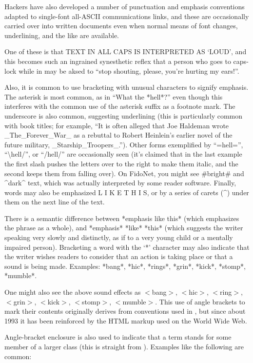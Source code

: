 Hackers have also developed a number of punctuation and emphasis conventions
adapted to single-font all-ASCII communications links, and these are
occasionally carried over into written documents even when normal means of font
changes, underlining, and the like are available.

One of these is that TEXT IN ALL CAPS IS INTERPRETED AS `LOUD', and this
becomes such an ingrained synesthetic reflex that a person who goes to
caps-lock while in  may be aksed to ``stop shouting,
please, you're hurting my ears!''.

Also, it is common to use bracketing with unusual characters to signify
emphasis. The asterisk is most common, as in ``What the *hell*?'' even though
this interferes with the common use of the asterisk suffix as a footnote mark.
The underscore is also common, suggesting underlining (this is particularly
common with book titles; for example, ``It is often alleged that Joe Haldeman
wrote \_The\_Forever\_War\_ as a rebuttal to Robert Heinlein's earlier novel of
the future military, \_Starship\_Troopers\_.''). Other forms exemplified by
``=hell='', ``\textbackslash hell/'', or ``/hell/'' are occasionally seen (it's
claimed that in the last example the first slash pushes the letters over to the
right to make them italic, and the second keeps them from falling over). On
FidoNet, you might see \#bright\# and \^{}dark\^{} text, which was actually
interpreted by some reader software. Finally, words may also be emphasized L I
K E T H I S, or by a series of carets (\^{}) under them on the next line of the
text.

There is a semantic difference between *emphasis like this* (which emphasizes
the phrase as a whole), and *emphasis* *like* *this* (which suggests the writer
speaking very slowly and distinctly, as if to a very young child or a mentally
impaired person). Bracketing a word with the `*' character may also indicate
that the writer wishes readers to consider that an action is taking place or
that a sound is being made. Examples: *bang*, *hic*, *rings*, *grin*, *kick*,
*stomp*, *mumble*.

One might also see the above sound effects as $<$bang$>$, $<$hic$>$,
$<$ring$>$, $<$grin$>$, $<$kick$>$, $<$stomp$>$, $<$mumble$>$. This use of
angle brackets to mark their contents originally derives from conventions used
in , but since about 1993 it has been reinforced by the HTML
markup used on the World Wide Web.

Angle-bracket enclosure is also used to indicate that a term stands for some
 member of a larger class (this is straight from
). Examples like the following are common:

